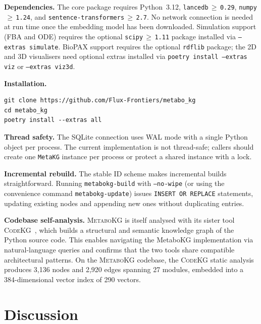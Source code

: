 \documentclass[10pt]{article}
\begin{document}
\textbf{Dependencies.} The core package requires Python~3.12,
\texttt{lancedb$\,\geq\,$0.29}, \texttt{numpy$\,\geq\,$1.24}, and
\texttt{sentence-transformers$\,\geq\,$2.7}. No network connection is needed
at run time once the embedding model has been downloaded. Simulation support
(FBA and ODE) requires the optional \texttt{scipy$\,\geq\,$1.11} package
installed via \texttt{--extras simulate}. BioPAX support requires the optional
\texttt{rdflib} package; the 2D and 3D visualisers need optional extras
installed via \texttt{poetry install --extras viz} or \texttt{--extras viz3d}.

\textbf{Installation.}

\begin{lstlisting}[style=bash]
git clone https://github.com/Flux-Frontiers/metabo_kg
cd metabo_kg
poetry install --extras all
\end{lstlisting}

\textbf{Thread safety.} The SQLite connection uses WAL mode with a single
Python object per process. The current implementation is not thread-safe;
callers should create one \texttt{MetaKG} instance per process or protect a
shared instance with a lock.

\textbf{Incremental rebuild.} The stable ID scheme makes incremental builds
straightforward. Running \texttt{metabokg-build} with \texttt{--no-wipe} (or using
the convenience command \texttt{metabokg-update}) issues \texttt{INSERT OR REPLACE}
statements, updating existing nodes and appending new ones without duplicating entries.

\textbf{Codebase self-analysis.} \textsc{MetaboKG} is itself analysed with its
sister tool \textsc{CodeKG}~\citep{fluxfrontiers2025codekg}, which builds a
structural and semantic knowledge graph of the Python source code. This
enables navigating the MetaboKG implementation via natural-language queries and
confirms that the two tools share compatible architectural patterns. On the
\textsc{MetaboKG} codebase, the \textsc{CodeKG} static analysis produces 3,136
nodes and 2,920 edges spanning 27 modules, embedded into a 384-dimensional
vector index of 290 vectors.

\section{Discussion}
\label{sec:discussion}
\end{document}
